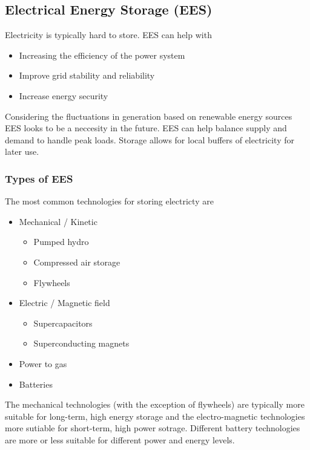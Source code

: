 \subsection{Electrical Energy Storage (EES)}
Electricity is typically hard to store. EES can help with
\begin{itemize}
    \item Increasing the efficiency of the power system
    \item Improve grid stability and reliability
    \item Increase energy security
\end{itemize}
Considering the fluctuations in generation based on renewable energy sources EES looks to be a neccesity in the future.
EES can help balance supply and demand to handle peak loads.
Storage allows for local buffers of electricity for later use.

\subsubsection{Types of EES}
The most common technologies for storing electricty are

\begin{itemize}
    \item Mechanical / Kinetic
        \begin{itemize}
            \item Pumped hydro
            \item Compressed air storage
            \item Flywheels
        \end{itemize}
    \item Electric / Magnetic field
        \begin{itemize}
            \item Supercapacitors
            \item Superconducting magnets
        \end{itemize}
    \item Power to gas
    \item Batteries
\end{itemize}

The mechanical technologies (with the exception of flywheels) are typically more suitable for long-term, high energy storage and the electro-magnetic technologies more sutiable for short-term, high power sotrage.
Different battery technologies are more or less suitable for different power and energy levels.

